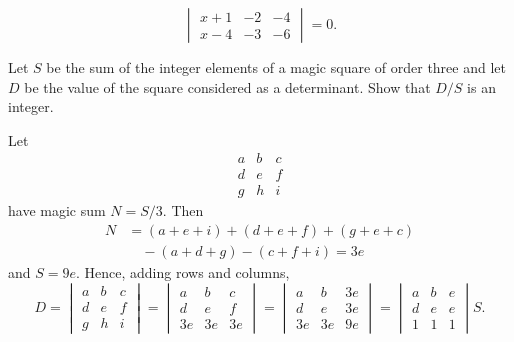 \begin{exercises}
\begin{answer}
\begin{equation*}
\begin{vmatrix}
          x+1  &-2   &-4   \\
          x-4  &-3   &-6
        \end{vmatrix}=0.
      \end{equation*}  
    \end{answer}
  \puzzle \item 
    Let \( S \) be the sum of the integer elements of a magic square of  order
    three and let \( D \) be the value of the square considered as a
    determinant.
    Show that \( D/S \) is an integer.
    \cite{Monthly49p33}
    \begin{answer}
      \answerasgiven
      Let
      \begin{equation*}
        \begin{array}{ccc}
          a  &b  &c  \\
          d  &e  &f  \\
          g  &h  &i
        \end{array}
      \end{equation*}
      have magic sum \( N=S/3 \).
      Then
      \begin{align*}
        N
        &=(a+e+i)+(d+e+f)+(g+e+c)   \\
        &\quad\text{}-(a+d+g)-(c+f+i)=3e
      \end{align*}
      and \( S=9e \).
      Hence, adding rows and columns,
      \begin{equation*}
        D=
        \begin{vmatrix}
          a  &b  &c  \\
          d  &e  &f  \\
          g  &h  &i
        \end{vmatrix}
        =\begin{vmatrix}
          a  &b  &c  \\
          d  &e  &f  \\
         3e  &3e &3e
        \end{vmatrix}             
        =\begin{vmatrix}
          a  &b  &3e \\
          d  &e  &3e \\
         3e  &3e &9e
        \end{vmatrix}             
        =\begin{vmatrix}
          a  &b  &e  \\
          d  &e  &e  \\
          1  &1  &1
        \end{vmatrix}S.

\end{equation*}
\end{answer}
\end{exercises}
